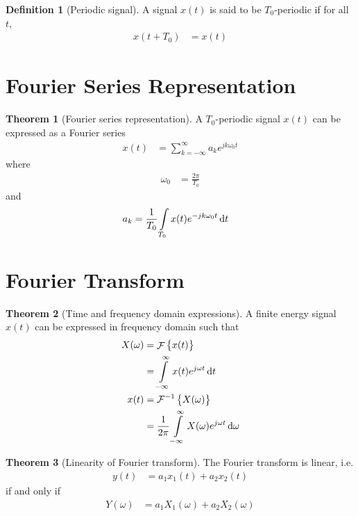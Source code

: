 \documentclass[titlepage, fleqn, a4paper, 12pt, twoside]{article}
\theoremstyle{definition}
\newtheorem{definition}{Definition}
\theoremstyle{theorem}
\newtheorem{theorem}{Theorem}
\DeclareMathOperator{\FT}{\mathcal{F}}
\DeclareMathOperator{\IFT}{\mathcal{F}^{-1}}
\begin{document}
\begin{definition}[Periodic signal]
	A signal $x(t)$ is said to be $T_0$-periodic if for all $t$,
	\begin{align*}
		x(t + T_0) &= x(t)
	\end{align*}
	\label{def:periodic_signal}
\end{definition}

\section{Fourier Series Representation}

\begin{theorem}[Fourier series representation]
	A $T_0$-periodic signal $x(t)$ can be expressed as a Fourier series
	\begin{align*}
		x(t) &= \sum\limits_{k = -\infty}^{\infty} a_k e^{j k \omega_0 t}
	\end{align*}
	where
	\begin{align*}
		\omega_0 &= \frac{2 \pi}{T_0}
	\end{align*}
	and
	\begin{align*}
		a_k &= \frac{1}{T_0} \int\limits_{T_0} x(t) e^{-j k \omega_0 t} \dif t
	\end{align*}
	\label{thm:Fourier_series_representation}
\end{theorem}

\section{Fourier Transform}

\begin{theorem}[Time and frequency domain expressions]
	A finite energy signal $x(t)$ can be expressed in frequency domain such that
	\begin{align*}
		X(\omega) &= \FT\left\{ x(t) \right\}\\
		&= \int\limits_{-\infty}^{\infty} x(t) e^{j \omega t} \dif t\\
		x(t) &= \IFT\left\{ X(\omega) \right\}\\
		&= \frac{1}{2 \pi} \int\limits_{-\infty}^{\infty} X(\omega) e^{j \omega t} \dif \omega
	\end{align*}
	\label{thm:time_and_frequency_domain_expressions}
\end{theorem}

\begin{theorem}[Linearity of Fourier transform]
	The Fourier transform is linear, i.e.
	\begin{align*}
		y(t) &= a_1 x_1(t) + a_2 x_2(t)
	\end{align*}
	if and only if
	\begin{align*}
		Y(\omega) &= a_1 X_1(\omega) + a_2 X_2(\omega)
	\end{align*}
	\label{thm:linearity_of_fourier_transform}
\end{theorem}
\end{document}
